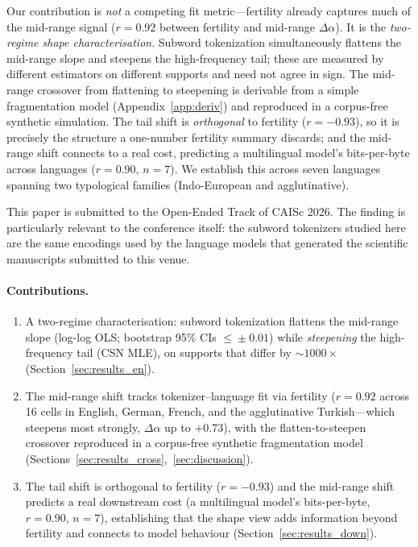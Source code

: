 \documentclass{article}
\begin{document}
Our contribution is \emph{not} a competing fit metric---fertility already captures much
of the mid-range signal ($r = 0.92$ between fertility and mid-range $\Delta\alpha$). It
is the \emph{two-regime shape characterisation}. Subword tokenization simultaneously
flattens the mid-range slope and steepens the high-frequency tail; these are measured by
different estimators on different supports and need not agree in sign. The mid-range
crossover from flattening to steepening is derivable from a simple fragmentation model
(Appendix~\ref{app:deriv}) and reproduced in a corpus-free synthetic simulation. The
tail shift is \emph{orthogonal} to fertility ($r = -0.93$), so it is precisely the
structure a one-number fertility summary discards; and the mid-range shift connects to a
real cost, predicting a multilingual model's bits-per-byte across languages
($r = 0.90$, $n=7$). We establish this across seven languages spanning two typological
families (Indo-European and agglutinative).

This paper is submitted to the Open-Ended Track of CAISc 2026. The finding is
particularly relevant to the conference itself: the subword tokenizers studied here are
the same encodings used by the language models that generated the scientific manuscripts
submitted to this venue.

\paragraph{Contributions.}
\begin{enumerate}
  \item A two-regime characterisation: subword tokenization flattens the mid-range slope
    (log-log OLS; bootstrap 95\% CIs $\leq\!\pm 0.01$) while \emph{steepening} the
    high-frequency tail (CSN MLE), on supports that differ by $\sim$$1000\times$
    (Section~\ref{sec:results_en}).
  \item The mid-range shift tracks tokenizer--language fit via fertility ($r = 0.92$
    across 16 cells in English, German, French, and the agglutinative Turkish---which
    steepens most strongly, $\Delta\alpha$ up to $+0.73$), with the flatten-to-steepen
    crossover reproduced in a corpus-free synthetic fragmentation model
    (Sections~\ref{sec:results_cross},~\ref{sec:discussion}).
  \item The tail shift is orthogonal to fertility ($r = -0.93$) and the mid-range shift
    predicts a real downstream cost (a multilingual model's bits-per-byte, $r = 0.90$, $n=7$),
    establishing that the shape view adds information beyond fertility and connects to
    model behaviour (Section~\ref{sec:results_down}).
\end{enumerate}
\end{document}
